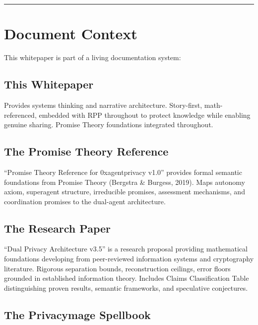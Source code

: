 \documentclass[
]{article}
\begin{document}
\begin{center}\rule{0.5\linewidth}{0.5pt}\end{center}

\section{Document Context}\label{document-context}

This whitepaper is part of a living documentation system:

\subsection{This Whitepaper}\label{this-whitepaper}

Provides systems thinking and narrative architecture. Story-first,
math-referenced, embedded with RPP throughout to protect knowledge while
enabling genuine sharing. Promise Theory foundations integrated
throughout.

\subsection{The Promise Theory
Reference}\label{the-promise-theory-reference}

``Promise Theory Reference for 0xagentprivacy v1.0'' provides formal
semantic foundations from Promise Theory (Bergstra \& Burgess, 2019).
Maps autonomy axiom, superagent structure, irreducible promises,
assessment mechanisms, and coordination promises to the dual-agent
architecture.

\subsection{The Research Paper}\label{the-research-paper}

``Dual Privacy Architecture v3.5'' is a research proposal providing
mathematical foundations developing from peer-reviewed information
systems and cryptography literature. Rigorous separation bounds,
reconstruction ceilings, error floors grounded in established
information theory. Includes Claims Classification Table distinguishing
proven results, semantic frameworks, and speculative conjectures.

\subsection{The Privacymage Spellbook}\label{the-privacymage-spellbook}
\end{document}
